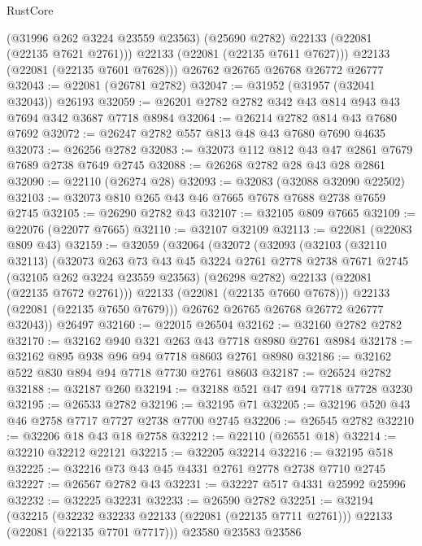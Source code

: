 \begin{lexlean}{RustCore}
\begin{coremodule}
          (@31996 @262 @3224 @23559 @23563)
          (@25690 @2782)
          @22133
          (@22081 (@22135 @7621 @2761)))
        @22133
        (@22081 (@22135 @7611 @7627)))
      @22133
      (@22081 (@22135 @7601 @7628)))
    @26762
    @26765
    @26768
    @26772
    @26777
@32043 := @22081 (@26781 @2782)
@32047 := @31952 (@31957 (@32041 @32043)) @26193
@32059 := @26201 @2782 @2782 @342 @43 @814 @943 @43 @7694 @342 @3687 @7718 @8984
@32064 := @26214 @2782 @814 @43 @7680 @7692
@32072 := @26247 @2782 @557 @813 @48 @43 @7680 @7690 @4635
@32073 := @26256 @2782
@32083 := @32073 @112 @812 @43 @47 @2861 @7679 @7689 @2738 @7649 @2745
@32088 := @26268 @2782 @28 @43 @28 @2861
@32090 := @22110 (@26274 @28)
@32093 := @32083 (@32088 @32090 @22502)
@32103 := @32073 @810 @265 @43 @46 @7665 @7678 @7688 @2738 @7659 @2745
@32105 := @26290 @2782 @43
@32107 := @32105 @809 @7665
@32109 := @22076 (@22077 @7665)
@32110 := @32107 @32109
@32113 := @22081 (@22083 @809 @43)
@32159 := @32059
    (@32064
      (@32072
        (@32093
          (@32103
            (@32110 @32113)
            (@32073
              @263
              @73
              @43
              @45
              @3224
              @2761
              @2778
              @2738
              @7671
              @2745
              (@32105 @262 @3224 @23559 @23563)
              (@26298 @2782)
              @22133
              (@22081 (@22135 @7672 @2761)))
            @22133
            (@22081 (@22135 @7660 @7678)))
          @22133
          (@22081 (@22135 @7650 @7679)))
        @26762
        @26765
        @26768
        @26772
        @26777
        @32043))
    @26497
@32160 := @22015 @26504
@32162 := @32160 @2782 @2782
@32170 := @32162 @940 @321 @263 @43 @7718 @8980 @2761 @8984
@32178 := @32162 @895 @938 @96 @94 @7718 @8603 @2761 @8980
@32186 := @32162 @522 @830 @894 @94 @7718 @7730 @2761 @8603
@32187 := @26524 @2782
@32188 := @32187 @260
@32194 := @32188 @521 @47 @94 @7718 @7728 @3230
@32195 := @26533 @2782
@32196 := @32195 @71
@32205 := @32196 @520 @43 @46 @2758 @7717 @7727 @2738 @7700 @2745
@32206 := @26545 @2782
@32210 := @32206 @18 @43 @18 @2758
@32212 := @22110 (@26551 @18)
@32214 := @32210 @32212 @22121
@32215 := @32205 @32214
@32216 := @32195 @518
@32225 := @32216 @73 @43 @45 @4331 @2761 @2778 @2738 @7710 @2745
@32227 := @26567 @2782 @43
@32231 := @32227 @517 @4331 @25992 @25996
@32232 := @32225 @32231
@32233 := @26590 @2782
@32251 := @32194
    (@32215
      (@32232 @32233 @22133 (@22081 (@22135 @7711 @2761)))
      @22133
      (@22081 (@22135 @7701 @7717)))
    @23580
    @23583
    @23586

\end{coremodule}
\end{lexlean}
